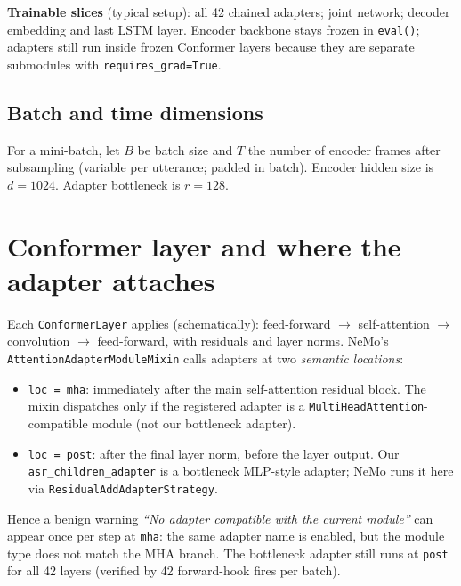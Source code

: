 \documentclass[11pt,a4paper]{article}
\begin{document}
\noindent
\textbf{Trainable slices} (typical setup): all 42 chained adapters; joint network; decoder embedding and last LSTM layer. Encoder backbone stays frozen in \texttt{eval()}; adapters still run inside frozen Conformer layers because they are separate submodules with \texttt{requires\_grad=True}.

\subsection{Batch and time dimensions}
For a mini-batch, let $B$ be batch size and $T$ the number of encoder frames after subsampling (variable per utterance; padded in batch). Encoder hidden size is $d=1024$. Adapter bottleneck is $r=128$.

\section{Conformer layer and where the adapter attaches}

Each \texttt{ConformerLayer} applies (schematically): feed-forward $\to$ self-attention $\to$ convolution $\to$ feed-forward, with residuals and layer norms. NeMo's \texttt{AttentionAdapterModuleMixin} calls adapters at two \emph{semantic locations}:

\begin{itemize}
  \item \texttt{loc = mha}: immediately after the main self-attention residual block. The mixin dispatches only if the registered adapter is a \texttt{MultiHeadAttention}-compatible module (not our bottleneck adapter).
  \item \texttt{loc = post}: after the final layer norm, before the layer output. Our \texttt{asr\_children\_adapter} is a bottleneck MLP-style adapter; NeMo runs it here via \texttt{ResidualAddAdapterStrategy}.
\end{itemize}

\noindent
Hence a benign warning \emph{``No adapter compatible with the current module''} can appear once per step at \texttt{mha}: the same adapter name is enabled, but the module type does not match the MHA branch. The bottleneck adapter still runs at \texttt{post} for all 42 layers (verified by 42 forward-hook fires per batch).
\end{document}
